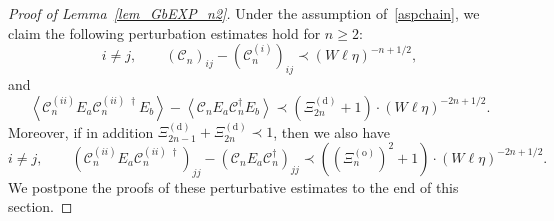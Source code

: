 \documentclass[10pt,reqno]{article}
\theoremstyle{plain} %
\theoremstyle{remark}
\numberwithin{equation}{section}
\begin{document}
\begin{proof}[Proof of Lemma~\ref{lem_GbEXP_n2}]
Under the assumption of~\eqref{aspchain}, we claim the following perturbation estimates hold for \( n \ge 2 \):
\begin{equation}\label{tancca}
i \ne j, \qquad 
\left( \mathcal{C}_n \right)_{ij}
- \left( \mathcal{C}^{(i)}_n \right)_{ij}
\prec (W \ell \eta)^{-n + 1/2},
\end{equation}
and
\begin{equation}\label{jsjuzggfnw}
\left\langle \mathcal{C}_n^{(ii)} E_a \mathcal{C}_n^{(ii)\;\dagger} E_b \right\rangle
- \left\langle \mathcal{C}_n E_a \mathcal{C}_n^\dagger E_b \right\rangle
\prec \left( \Xi_{2n}^{(\mathrm{d})} + 1 \right) \cdot (W \ell \eta)^{-2n + 1/2}.
\end{equation}
Moreover, if in addition \( \Xi_{2n-1}^{(\mathrm{d})}+\Xi_{2n}^{(\mathrm{d})} \prec 1 \), then we also have
\begin{equation}\label{jsjuzggf}
i \ne j, \qquad
\left( \mathcal{C}_n^{(ii)} E_a \mathcal{C}_n^{(ii)\;\dagger} \right)_{jj} 
- \left( \mathcal{C}_n E_a \mathcal{C}_n^\dagger \right)_{jj} 
\prec \left( \left( \Xi_n^{(\mathrm{o})} \right)^2 + 1 \right) \cdot (W \ell \eta)^{-2n + 1/2}.
\end{equation}
We postpone the proofs of these perturbative estimates to the end of this section. 



\end{proof}
\end{document}
